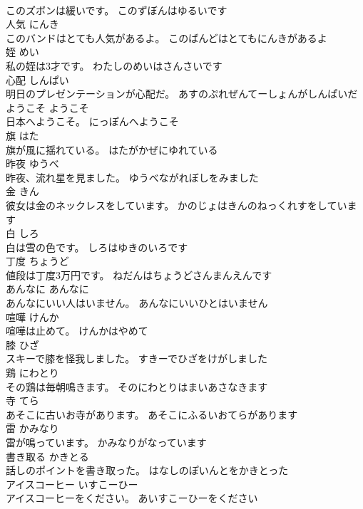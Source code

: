 \documentclass[8pt]{extreport}
\begin{document}
\begin{CJK}{UTF8}{min}
\\	このズボンは緩いです。	このずぼんはゆるいです	
\\	人気	にんき	
\\	このバンドはとても人気があるよ。	このばんどはとてもにんきがあるよ	
\\	姪	めい	
\\	私の姪は3才です。	わたしのめいはさんさいです	
\\	心配	しんぱい	
\\	明日のプレゼンテーションが心配だ。	あすのぷれぜんてーしょんがしんぱいだ	
\\	ようこそ	ようこそ	
\\	日本へようこそ。	にっぽんへようこそ	
\\	旗	はた	
\\	旗が風に揺れている。	はたがかぜにゆれている	
\\	昨夜	ゆうべ	
\\	昨夜、流れ星を見ました。	ゆうべながれぼしをみました	
\\	金	きん	
\\	彼女は金のネックレスをしています。	かのじょはきんのねっくれすをしています	
\\	白	しろ	
\\	白は雪の色です。	しろはゆきのいろです	
\\	丁度	ちょうど	
\\	値段は丁度3万円です。	ねだんはちょうどさんまんえんです	
\\	あんなに	あんなに	
\\	あんなにいい人はいません。	あんなにいいひとはいません	
\\	喧嘩	けんか	
\\	喧嘩は止めて。	けんかはやめて	
\\	膝	ひざ	
\\	スキーで膝を怪我しました。	すきーでひざをけがしました	
\\	鶏	にわとり	
\\	その鶏は毎朝鳴きます。	そのにわとりはまいあさなきます	
\\	寺	てら	
\\	あそこに古いお寺があります。	あそこにふるいおてらがあります	
\\	雷	かみなり	
\\	雷が鳴っています。	かみなりがなっています	
\\	書き取る	かきとる	
\\	話しのポイントを書き取った。	はなしのぽいんとをかきとった	
\\	アイスコーヒー	いすこーひー	
\\	アイスコーヒーをください。	あいすこーひーをください	

\end{CJK}
\end{document}

